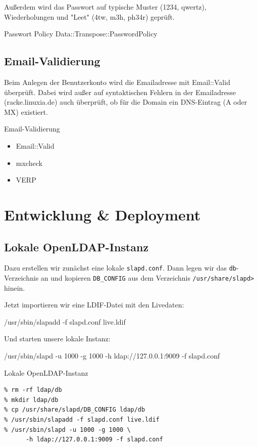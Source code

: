 Außerdem wird das Passwort auf typische Muster (1234, qwertz),
Wiederholungen und "Leet" (4tw, m3h, ph34r) geprüft.

\begin{frame}{Passwort Policy}
Data::Transpose::PasswordPolicy
\end{frame}

\subsection{Email-Validierung}

Beim Anlegen der Benutzerkonto wird die Emailadresse
mit Email::Valid überprüft. Dabei wird außer auf
syntaktischen Fehlern in der Emailadresse (racke.linuxia.de)
auch überprüft, ob für die Domain ein DNS-Eintrag (A oder MX)
existiert.    
                   
\begin{frame}{Email-Validierung}
\begin{itemize}
\item Email::Valid
\item mxcheck
\end{itemize}
\begin{itemize}
\item VERP
\end{itemize}
\end{frame}

\section{Entwicklung \& Deployment}

\subsection{Lokale OpenLDAP-Instanz}

Dazu erstellen wir zunächst eine lokale \verb|slapd.conf|. Dann legen
wir das \verb|db|-Verzeichnis an und kopieren \verb|DB_CONFIG| aus dem
Verzeichnis \verb|/usr/share/slapd>| hinein.

Jetzt importieren wir eine LDIF-Datei mit den Livedaten:

    /usr/sbin/slapadd -f slapd.conf live.ldif

Und starten unsere lokale Instanz:

    /usr/sbin/slapd -u 1000 -g 1000 -h ldap://127.0.0.1:9009 -f slapd.conf

\begin{frame}[fragile]{Lokale OpenLDAP-Instanz}
\begin{lstlisting}
% rm -rf ldap/db
% mkdir ldap/db
% cp /usr/share/slapd/DB_CONFIG ldap/db
% /usr/sbin/slapadd -f slapd.conf live.ldif
% /usr/sbin/slapd -u 1000 -g 1000 \
      -h ldap://127.0.0.1:9009 -f slapd.conf
\end{lstlisting}
\end{frame}

